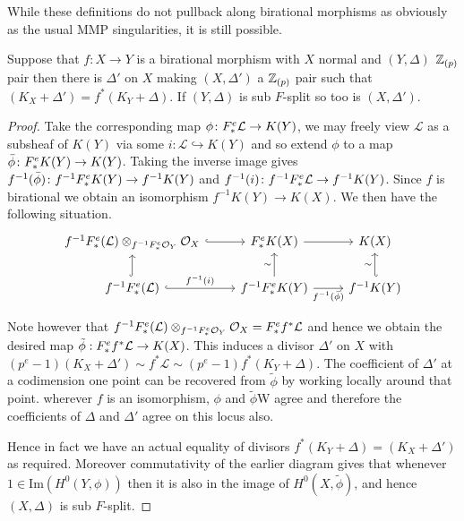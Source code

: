 While these definitions do not pullback along birational morphisms as obviously as the usual MMP singularities, it is still possible.

\begin{lemma}\label{F-pullback}
	Suppose that $f\colon X \to Y$ is a birational morphism with $X$ normal and $(Y,\Delta)$ $\mathbb{Z}_{(p)}$ pair then there is $\Delta'$ on $X$ making $(X,\Delta')$ a $\mathbb{Z}_{(p)}$ pair such that $(K_{X}+\Delta')=f^{*}(K_{Y}+\Delta)$.  If $(Y,\Delta)$ is sub $F$-split so too is $(X,\Delta')$.
\end{lemma}
\begin{proof}
	
	Take the corresponding map $\phi\colon F^{e}_{*}\mathcal{L} \to K(Y)$, we may freely view $\mathcal{L}$ as a subsheaf of $K(Y)$ via some $i \colon \mathcal{L} \hookrightarrow K(Y)$ and so extend $\phi$ to a map $\bar{\phi}\colon F^{e}_{*} K(Y) \to K(Y)$. Taking the inverse image gives $f^{-1}(\bar{\phi})\colon f^{-1}F^{e}_{*} K(Y) \to f^{-1}K(Y)$ and $f^{-1}(i) \colon f^{-1}F^{e}_{*} \mathcal{L} \to f^{-1}K(Y)$. Since $f$ is birational we obtain an isomorphism $f^{-1}K(Y) \to K(X)$. We then have the following situation.
	\[\begin{tikzcd}
	f^{-1}\Fe(\mathcal{L}) \otimes_{f^{-1}\Fe\mathcal{O}_{Y}}\ox \arrow[r, hook] & \Fe K(X) \arrow[r]                                          & K(X)                                \\
	f^{-1}\Fe(\mathcal{L}) \arrow[r, hook, "f^{-1}(i)"] \arrow[u, hook]                       & f^{-1}\Fe K(Y) \arrow[r, "f^{-1}(\bar{\phi})"'] \arrow[u, "\sim"] & f^{-1}K(Y) \arrow[u, "\sim", hook']
	\end{tikzcd}\]
	
	Note however that $f^{-1}F^{e}_{*}(\mathcal{L}) \otimes_{f^{-1}F^{e}_{*}\mathcal{O}_{Y}}\mathcal{O}_{X}= F^{e}_{*} f^{*}\mathcal{L}$ and hence we obtain the desired map $\tilde{\phi}: F^{e}_{*} f^{*}\mathcal{L} \to K(X)$. This induces a divisor $\Delta'$ on $X$ with $(p^{e}-1)(K_{X}+\Delta') \sim f^{*}\mathcal{L} \sim (p^{e}-1)f^{*}(K_{Y}+\Delta)$. The coefficient of $\Delta'$ at a codimension one point can be recovered from $\tilde{\phi}$ by working locally around that point. wherever $f$ is an isomorphism, $\phi$ and $\tilde{\phi}$W agree and therefore the coefficients of $\Delta$ and $\Delta'$ agree on this locus also.
	
	Hence in fact we have an actual equality of divisors $f^{*}(K_{Y}+\Delta)=(K_{X}+\Delta')$ as required. Moreover commutativity of the earlier diagram gives that whenever $1 \in \text{Im}(H^{0}(Y,\phi))$ then it is also in the image of $H^{0}(X,\tilde{\phi})$, and hence $(X,\Delta)$ is sub $F$-split.
\end{proof}


